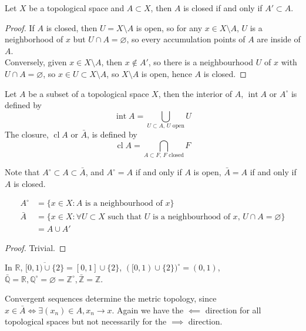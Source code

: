 \begin{proposition}
    Let $X$ be a topological space and $A\subset X$, then $A$ is closed if and only if $A'\subset A$.
\end{proposition}
\begin{proof}
    If $A$ is closed, then $U=X\setminus A$ is open, so for any $x\in X\setminus A$, $U$ is a neighborhood of $x$ but $U\cap A=\varnothing$, so every accumulation points of $A$ are inside of $A$.\\
    Conversely, given $x\in X\setminus A$, then $x\notin A'$, so there is a neighbourhood $U$ of $x$ with $U\cap A=\varnothing$, so $x\in U\subset X\setminus A$, so $X\setminus A$ is open, hence $A$ is closed.
\end{proof}
\begin{definition}
    Let $A$ be a subset of a topological space $X$, then the interior of $A$, $\operatorname{int}A$ or $A^\circ$ is defined by
    $$\operatorname{int}A=\bigcup_{U\subset A\text{, $U$ open}}U$$
    The closure, $\operatorname{cl}A$ or $\bar A$, is defined by
    $$\operatorname{cl}A=\bigcap_{A\subset F\text{, $F$ closed}}F$$
\end{definition}
Note that $A^\circ\subset A\subset\bar{A}$, and $A^\circ =A$ if and only if $A$ is open, $\bar A=A$ if and only if $A$ is closed.
\begin{proposition}
    \begin{align*}
        A^\circ&=\{x\in X:\text{$A$ is a neighbourhood of $x$}\}\\
        \bar{A}&=\{x\in X:\text{$\forall U\subset X$ such that $U$ is a neighbourhood of $x$, $U\cap A=\varnothing$}\}\\
        &=A\cup A'
    \end{align*}
\end{proposition}
\begin{proof}
    Trivial.
\end{proof}
\begin{example}
    In $\mathbb R$, $\overline{[0,1)\cup\{2\}}=[0,1]\cup\{2\}$, $([0,1)\cup\{2\})^\circ=(0,1)$, $\bar{\mathbb{Q}}=\mathbb R, \mathbb Q^\circ=\varnothing=\mathbb Z^\circ, \bar{\mathbb Z}=\mathbb Z$.
\end{example}
\begin{remark}
    Convergent sequences determine the metric topology, since $x\in\bar{A}\iff \exists (x_n)\in A, x_n\to x$.
    Again we have the $\impliedby$ direction for all topological spaces but not necessarily for the $\implies$ direction.
\end{remark}

